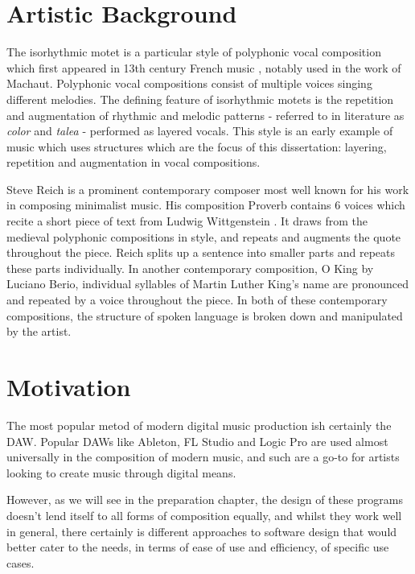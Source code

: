 \documentclass[12pt,a4paper,twoside,openright]{report}
\begin{document}
\section{Artistic Background}
The isorhythmic motet is a particular style of polyphonic vocal composition which first appeared in 13th century French music \cite{Bent01}, notably used in the work of Machaut. Polyphonic vocal compositions consist of multiple voices singing different melodies. The defining feature of isorhythmic motets is the repetition and augmentation of rhythmic and melodic patterns - referred to in literature as \textit{color} and \textit{talea} - performed as layered vocals. This style is an early example of music which uses structures which are the focus of this dissertation: layering, repetition and augmentation in vocal compositions.

Steve Reich is a prominent contemporary composer most well known for his work in composing minimalist music. His composition Proverb contains 6 voices which recite a short piece of text from Ludwig Wittgenstein \cite{ReichProverb}. It draws from the medieval polyphonic compositions in style, and repeats and augments the quote throughout the piece. Reich splits up a sentence into smaller parts and repeats these parts individually. In another contemporary composition, O King by Luciano Berio, individual syllables of Martin Luther King's name are pronounced and repeated by a voice throughout the piece. In both of these contemporary compositions, the structure of spoken language is broken down and manipulated by the artist.

\section{Motivation}
 The most popular metod of modern digital music production ish certainly the DAW. Popular DAWs like Ableton, FL Studio and Logic Pro are used almost universally in the composition of modern music, and such are a go-to for artists looking to create music through digital means.

 However, as we will see in the preparation chapter, the design of these programs doesn't lend itself to all forms of composition equally, and whilst they work well in general, there certainly is different approaches to software design that would better cater to the needs, in terms of ease of use and efficiency, of specific use cases.
\end{document}
